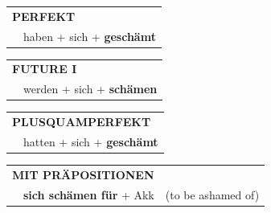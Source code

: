 \documentclass[10pt,a4paper]{revtex4-2}
\begin{document}
\begin{verbbox-acc}
 \begin{tabular}{rl}
     \multicolumn{2}{l}{\textbf{PERFEKT}}\\
    &haben + sich + \textbf{geschämt}\\
  \end{tabular}
\hfill
   \begin{tabular}{rl}
   
    \multicolumn{2}{l}{\textbf{FUTURE I} }\\
    &werden + sich + \textbf{schämen}\\
 
  \end{tabular}
\hfill
   \begin{tabular}{rl}
      \multicolumn{2}{l}{\textbf{PLUSQUAMPERFEKT}}\\
    &hatten + sich + \textbf{geschämt}\\
  \end{tabular}
  
\vspace{10pt}

   \begin{tabular}{lll}
      \multicolumn{3}{l}{\textbf{MIT PRÄPOSITIONEN}}\\
& \textbf{sich schämen für} + Akk & (to be ashamed of)
  \end{tabular}
  
  \vspace{-5pt}

\end{verbbox-acc}
\end{document}

